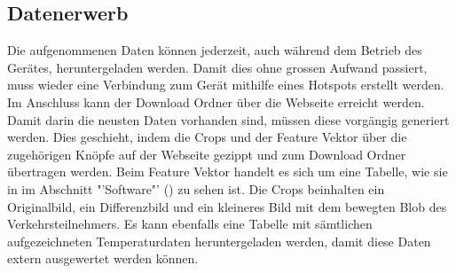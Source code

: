 \subsection{Datenerwerb}
Die aufgenommenen Daten können jederzeit, auch während dem Betrieb des Gerätes, heruntergeladen werden. Damit dies ohne grossen Aufwand passiert, muss wieder eine Verbindung zum Gerät mithilfe eines Hotspots erstellt werden. Im Anschluss kann der Download Ordner über die Webseite erreicht werden. Damit darin die neusten Daten vorhanden sind, müssen diese vorgängig generiert werden. Dies geschieht, indem die Crops und der Feature Vektor über die zugehörigen Knöpfe auf der Webseite gezippt und zum Download Ordner übertragen werden. Beim Feature Vektor handelt es sich um eine Tabelle, wie sie in im Abschnitt "'Software"' () zu sehen ist. Die Crops beinhalten ein Originalbild, ein Differenzbild und ein kleineres Bild mit dem bewegten Blob des Verkehrsteilnehmers. Es kann ebenfalls eine Tabelle mit sämtlichen aufgezeichneten Temperaturdaten heruntergeladen werden, damit diese Daten extern ausgewertet werden können.